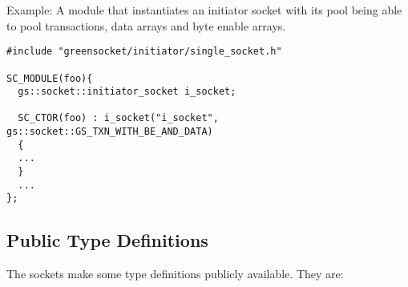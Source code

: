 \documentclass[a4paper,10pt]{article}          %
\begin{document}
Example: A module that instantiates an initiator socket with its pool being able to pool transactions, data arrays and byte enable arrays.

\begin{small}
\begin{verbatim}
#include "greensocket/initiator/single_socket.h"

SC_MODULE(foo){
  gs::socket::initiator_socket i_socket;
  
  SC_CTOR(foo) : i_socket("i_socket", gs::socket::GS_TXN_WITH_BE_AND_DATA)
  {
  ...
  }
  ...
};
\end{verbatim}
\end{small}

\subsection{Public Type Definitions}

The sockets make some type definitions publicly available. They are:
\end{document}
